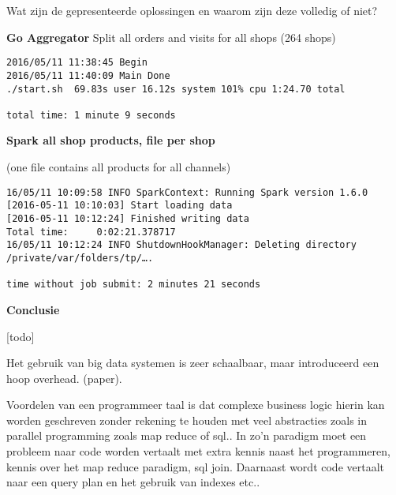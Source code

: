 Wat zijn de gepresenteerde oplossingen en waarom zijn deze volledig of niet?

\textbf{Go Aggregator}
Split all orders and visits for all shops (264 shops)

\begin{lstlisting}
2016/05/11 11:38:45 Begin
2016/05/11 11:40:09 Main Done
./start.sh  69.83s user 16.12s system 101% cpu 1:24.70 total

total time: 1 minute 9 seconds
\end{lstlisting}

\textbf{Spark all shop products, file per shop}

(one file contains all products for all channels)

\begin{lstlisting}
16/05/11 10:09:58 INFO SparkContext: Running Spark version 1.6.0
[2016-05-11 10:10:03] Start loading data
[2016-05-11 10:12:24] Finished writing data
Total time:     0:02:21.378717
16/05/11 10:12:24 INFO ShutdownHookManager: Deleting directory /private/var/folders/tp/….

time without job submit: 2 minutes 21 seconds
\end{lstlisting}


\textbf{Conclusie}

[todo]

Het gebruik van big data systemen is zeer schaalbaar, maar introduceerd een hoop overhead. (paper). 

Voordelen van een programmeer taal is dat complexe business logic hierin kan worden geschreven zonder rekening te houden met veel abstracties zoals in parallel programming zoals map reduce of sql.. In zo'n paradigm moet een probleem naar code worden vertaalt met extra kennis naast het programmeren, kennis over het map reduce paradigm, sql join. Daarnaast wordt code vertaalt naar een query plan en het gebruik van indexes etc..

